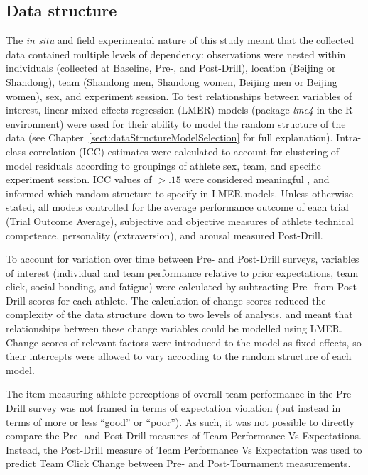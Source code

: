 \begin{CJK}{UTF8}{gbsn}




\subsection{Data structure}
The \textit{in situ} and field experimental nature of this study meant that the collected data contained multiple levels of dependency: observations were nested within individuals (collected at Baseline, Pre-, and Post-Drill), location (Beijing or Shandong), team (Shandong men, Shandong women, Beijing men or Beijing women), sex, and experiment session.   To test relationships between variables of interest, linear mixed effects regression (LMER) models (package \textit{lme4} in the R environment) were used for their ability to model the random structure of the data (see Chapter~\ref{sect:dataStructureModelSelection} for full explanation).  Intra-class correlation (ICC) estimates were calculated to account for clustering of model residuals according to groupings of athlete sex, team, and specific experiment session.  ICC values of $>.15$ were considered meaningful \citep{Field2012}, and informed which random structure to specify in LMER models.  Unless otherwise stated, all models controlled for the average performance outcome of each trial (Trial Outcome Average), subjective and objective measures of athlete technical competence, personality (extraversion), and arousal measured Post-Drill.

To account for variation over time between Pre- and Post-Drill surveys, variables of interest (individual and team performance relative to prior expectations, team click, social bonding, and fatigue) were calculated by subtracting Pre- from Post-Drill scores for each athlete. The calculation of change scores reduced the complexity of the data structure down to two levels of analysis, and meant that relationships between these change variables could be modelled using LMER. Change scores of relevant factors were introduced to the model as fixed effects, so their intercepts were allowed to vary according to the random structure of each model.

 The item measuring athlete perceptions of overall team performance in the Pre-Drill survey was not framed in terms of expectation violation (but instead in terms of more or less ``good'' or ``poor'').  As such, it was not possible to directly compare the Pre- and Post-Drill measures of Team Performance Vs Expectations.  Instead, the Post-Drill measure of Team Performance Vs Expectation was used to predict Team Click Change between Pre- and Post-Tournament measurements.



\end{CJK}
